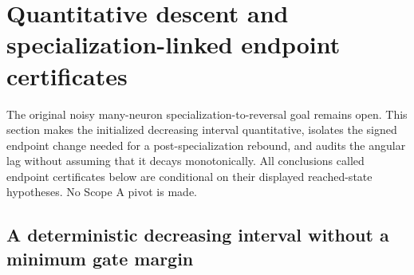 \documentclass[11pt]{article}
\theoremstyle{remark}
\begin{document}
\section{Quantitative descent and specialization-linked endpoint certificates}
\label{sbend:scope}

The original noisy many-neuron specialization-to-reversal goal remains open.
This section makes the initialized decreasing interval quantitative, isolates
the signed endpoint change needed for a post-specialization rebound, and
audits the angular lag without assuming that it decays monotonically.
All conclusions called endpoint certificates below are conditional on their
displayed reached-state hypotheses. No Scope A pivot is made.

\subsection{A deterministic decreasing interval without a minimum gate margin}
\end{document}
